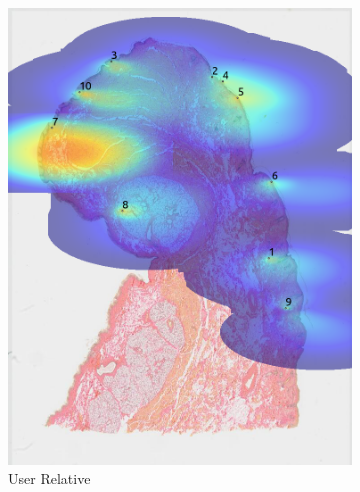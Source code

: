 \documentclass[a4paper,11pt]{report}
\numberwithin{figure}{chapter} %
\begin{document}
\begin{itemize}
\begin{figure}[H]
\begin{subfigure}[b]{0.19\textwidth}
            \includegraphics[width=\textwidth]{images/5501147_heatmap_user.png}
            \caption{User Relative}
            \end{subfigure}
            \begin{subfigure}[b]{0.19\textwidth}

\end{subfigure}
\end{figure}
\end{itemize}
\end{document}
